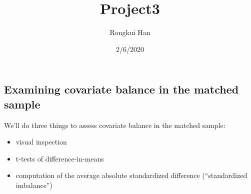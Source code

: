 \documentclass[]{article}
\title{Project3}
\author{Rongkui Han}
\date{2/6/2020}
\providecommand{\tightlist}{%
  \setlength{\itemsep}{0pt}\setlength{\parskip}{0pt}}
\begin{document}
\maketitle

\hypertarget{examining-covariate-balance-in-the-matched-sample}{%
\subsection{Examining covariate balance in the matched sample}\label{examining-covariate-balance-in-the-matched-sample}}

We'll do three things to assess covariate balance in the matched sample:

\begin{itemize}
\tightlist
\item
  visual inspection
\item
  t-tests of difference-in-means
\item
  computation of the average absolute standardized difference (``standardized imbalance'')
\end{itemize}
\end{document}
